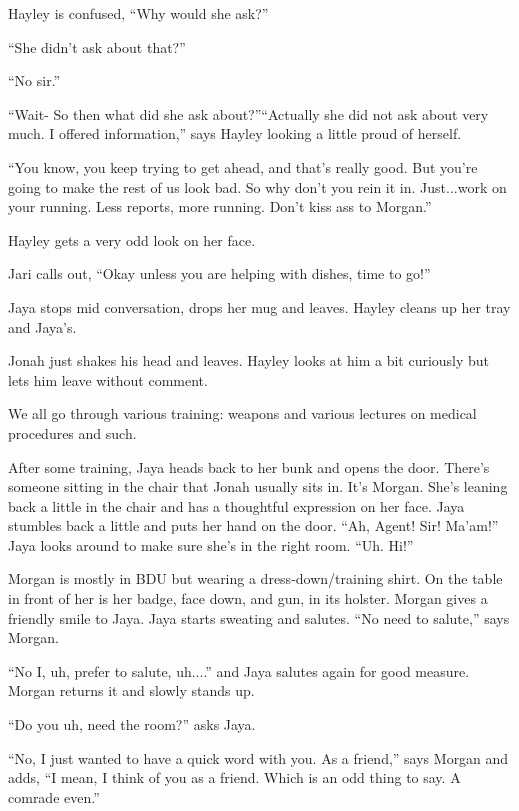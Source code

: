 Hayley is confused, ``Why would she ask?''

``She didn't ask about that?''

``No sir.''

``Wait- So then what did she ask about?''``Actually she did not ask about very much.  I offered information,'' says Hayley looking a little proud of herself.

``You know, you keep trying to get ahead, and that's really good.  But you're going to make the rest of us look bad.  So why don't you rein it in.  Just...work on your running.  Less reports, more running.  Don't kiss ass to Morgan.''

Hayley gets a very odd look on her face.

Jari calls out, ``Okay unless you are helping with dishes, time to go!''

Jaya stops mid conversation, drops her mug and leaves.  Hayley cleans up her tray and Jaya's.

Jonah just shakes his head and leaves.  Hayley looks at him a bit curiously but lets him leave without comment. 





We all go through various training: weapons and various lectures on medical procedures and such.



After some training, Jaya heads back to her bunk and opens the door.  There's someone sitting in the chair that Jonah usually sits in.  It's Morgan. She's leaning back a little in the chair and has a thoughtful expression on her face.  Jaya stumbles back a little and puts her hand on the door.  ``Ah, Agent!  Sir!  Ma'am!''  Jaya looks around to make sure she's in the right room.  ``Uh.  Hi!''



Morgan is mostly in BDU but wearing a dress-down/training shirt.  On the table in front of her is her badge, face down, and gun, in its holster.  Morgan gives a friendly smile to Jaya.  Jaya starts sweating and salutes.  ``No need to salute,'' says Morgan.

``No I, uh, prefer to salute, uh....'' and Jaya salutes again for good measure.  Morgan returns it and slowly stands up.

``Do you uh, need the room?'' asks Jaya.

``No, I just wanted to have a quick word with you.  As a friend,'' says Morgan and adds, ``I mean, I think of you as a friend.  Which is an odd thing to say.  A comrade even.''

